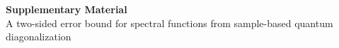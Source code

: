 \clearpage
\onecolumngrid
\begin{center}
{\large\bfseries Supplementary Material}\\[2pt]
{\normalsize A two-sided error bound for spectral functions from sample-based quantum diagonalization}
\end{center}
\setcounter{section}{0}
\setcounter{subsection}{0}
\setcounter{figure}{0}
\setcounter{table}{0}
\setcounter{equation}{0}
\makeatletter{}\makeatother
\renewcommand{\thesection}{S\arabic{section}}
\renewcommand{\thesubsection}{\thesection.\arabic{subsection}}
\renewcommand{\thefigure}{S\arabic{figure}}
\renewcommand{\thetable}{S\arabic{table}}
\renewcommand{\theequation}{S\arabic{equation}}
\makeatletter\renewcommand{\p@subsection}{}\renewcommand{\p@subsubsection}{}\makeatother
